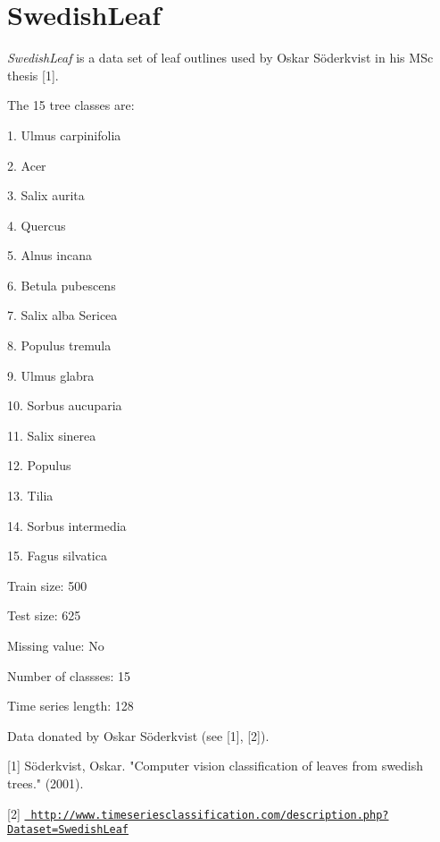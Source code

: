 \chapter{Swedish\+Leaf}
\hypertarget{md_external_2data_2UCRArchive__2018_2SwedishLeaf_2README}{}\label{md_external_2data_2UCRArchive__2018_2SwedishLeaf_2README}
\label{md_external_2data_2UCRArchive__2018_2SwedishLeaf_2README_autotoc_md216}%
%
 {\itshape Swedish\+Leaf} is a data set of leaf outlines used by Oskar Söderkvist in his MSc thesis \mbox{[}1\mbox{]}.

The 15 tree classes are\+:
\begin{DoxyItemize}
\item 1. Ulmus carpinifolia
\item 2. Acer
\item 3. Salix aurita
\item 4. Quercus
\item 5. Alnus incana
\item 6. Betula pubescens
\item 7. Salix alba \textquotesingle{}Sericea\textquotesingle{}
\item 8. Populus tremula
\item 9. Ulmus glabra
\item 10. Sorbus aucuparia
\item 11. Salix sinerea
\item 12. Populus
\item 13. Tilia
\item 14. Sorbus intermedia
\item 15. Fagus silvatica
\end{DoxyItemize}

Train size\+: 500

Test size\+: 625

Missing value\+: No

Number of classses\+: 15

Time series length\+: 128

Data donated by Oskar Söderkvist (see \mbox{[}1\mbox{]}, \mbox{[}2\mbox{]}).

\mbox{[}1\mbox{]} Söderkvist, Oskar. "{}\+Computer vision classification of leaves from swedish trees."{} (2001).

\mbox{[}2\mbox{]} \href{http://www.timeseriesclassification.com/description.php?Dataset=SwedishLeaf}{\texttt{ http\+://www.\+timeseriesclassification.\+com/description.\+php?\+Dataset=\+Swedish\+Leaf}} 